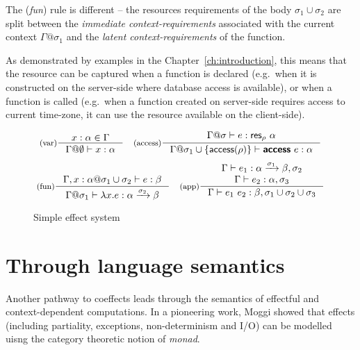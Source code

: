 The (\emph{fun}) rule is different -- the resources requirements of the body $\sigma_1 \cup \sigma_2$
are split between the \emph{immediate context-requirements} associated with the current context 
$\Gamma @ \sigma_1$ and the \emph{latent context-requirements} of the function.

As demonstrated by examples in the Chapter~\ref{ch:introduction}, this means that the resource
can be captured when a function is declared (e.g.~when it is constructed on the server-side
where database access is available), or when a function is called (e.g.~when a function created
on server-side requires access to current time-zone, it can use the resource available on the
client-side).


\begin{figure}[t]
\begin{equation*}
\inference[(var)]
  {x:\alpha \in \Gamma }
  {\Gamma @ \emptyset \vdash x : \alpha }
\quad
\inference[(access)]
  { \Gamma @ \sigma \vdash e : \ident{res}_\rho~\alpha }
  {\Gamma @ \sigma_1 \cup \{\ident{access}(\rho)\} \vdash \kvd{access}~e : \alpha }
\end{equation*}
\begin{equation*}
\inference[(fun)]
  {\Gamma, x:\alpha @ \sigma_1 \cup \sigma_2 \vdash e : \beta }
  {\Gamma @ \sigma_1 \vdash \lambda x.e : \alpha \xrightarrow{\sigma_2} \beta}
\quad  
\inference[(app)]
  {\Gamma \vdash e_1 : \alpha \xrightarrow{\sigma_1} \beta, \sigma_2 \\
   \Gamma \vdash e_2 : \alpha, \sigma_3 }
  {\Gamma \vdash e_1~e_2 : \beta, \sigma_1 \cup \sigma_2 \cup \sigma_3 }
\end{equation*}

\caption{Simple effect system}
\label{fig:path-coeff}
\end{figure}


\section{Through language semantics}
\label{sec:path-sem}

Another pathway to coeffects leads through the semantics of effectful and context-dependent 
computations. In a pioneering work, Moggi \cite{monad-notions} showed that effects (including
partiality, exceptions, non-determinism and I/O) can be modelled uisng the category theoretic
notion of \emph{monad}.

